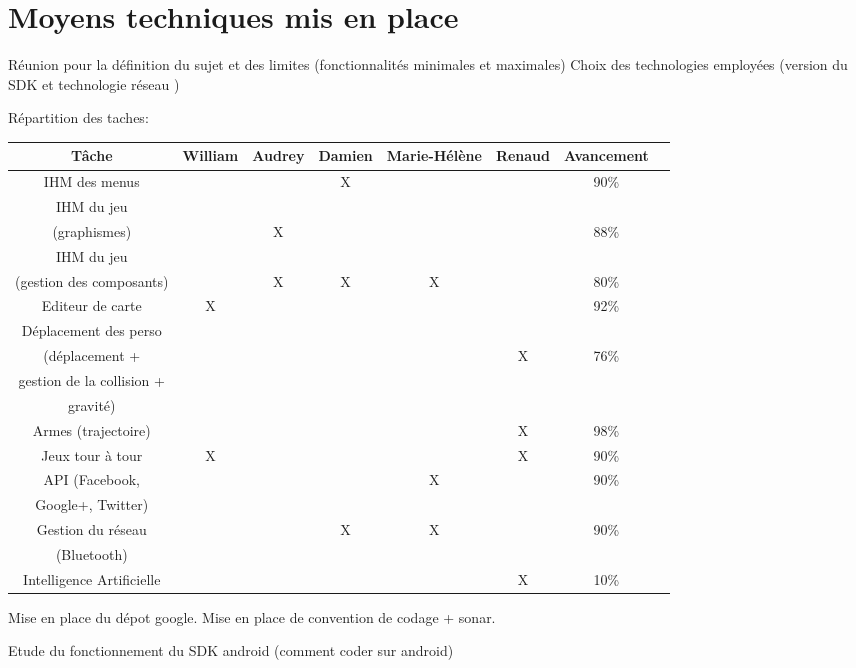 \documentclass{report}
\begin{document}
\section{Moyens techniques mis en place}

Réunion pour la définition du sujet et des limites (fonctionnalités minimales et maximales)
Choix des technologies employées (version du SDK et technologie réseau )
\bigskip

Répartition des taches:

\begin{tabular}{|c|c|c|c|c|c|c|c|}
\hline
{\bf Tâche } & {\bf William } & {\bf Audrey } & {\bf Damien } & {\bf Marie-Hélène } & {\bf Renaud } & {\bf Avancement}\\
\hline
{IHM des menus} & {} & {} & {X} & {} & {} & {90\%}\\
\hline
{IHM du jeu} & {} & {} & {} & {} & {} & {}\\
{(graphismes)} & {} & {X} & {} & {} & {} & {88\%}\\
\hline
{IHM du jeu} & {} & {} & {} & {} & {} & {}\\
{(gestion des composants)} & {} & {X} & {X} & {X} & {} & {80\%}\\
\hline
{Editeur de carte} & {X} & {} & {} & {} & {} & {92\%}\\
\hline
Déplacement des perso &&&&&&\\
(déplacement + &&&&& X&76\%\\
gestion de la collision + &&&&&&\\
 gravité) &&&&&&\\
\hline
{Armes (trajectoire)} & {} & {} & {} & {} & {X} & {98\%}\\
\hline
{Jeux tour à tour} & {X} & {} & {} & {} & {X} & {90\%}\\
\hline
{API (Facebook,} & {} & {} & {} & {X} & {} & {90\%}\\
{ Google+, Twitter)} & {} & {} & {} & {} & {} & {}\\
\hline
{Gestion du réseau} & {} & {} & {X} & {X} & {} & {90\%}\\
{(Bluetooth)} & {} & {} & {} & {} & {} & {}\\
\hline
{Intelligence Artificielle} & {} & {} & {} & {} & {X} & {10\%}\\
\hline
\end{tabular}
\bigskip


Mise en place du dépot google.
Mise en place de convention de codage + sonar.

Etude du fonctionnement du SDK android (comment coder sur android)
\bigskip
\end{document}
